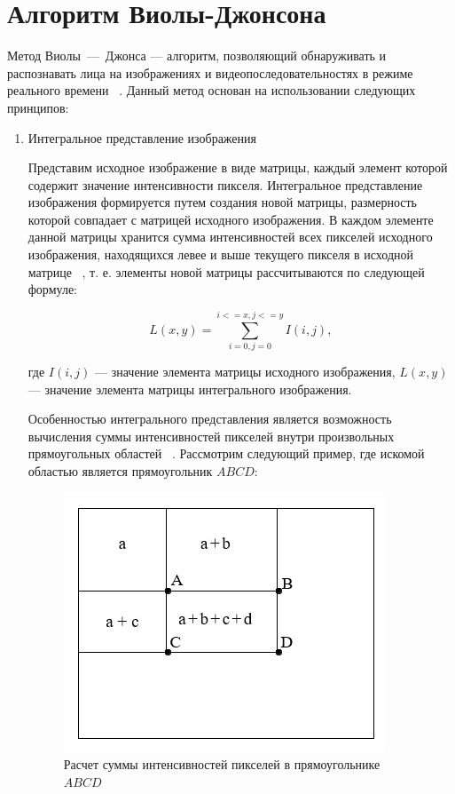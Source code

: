 \chapter{Алгоритм Виолы-Джонсона}

Метод Виолы~---~Джонса --- алгоритм, позволяющий обнаруживать и распознавать лица на изображениях и видеопоследовательностях в режиме реального времени ~\cite{viola}. Данный метод основан на использовании следующих принципов:
\begin{enumerate}
    \item Интегральное представление изображения

    Представим исходное изображение в виде матрицы, каждый элемент которой содержит значение интенсивности пикселя. Интегральное представление изображения формируется путем создания новой матрицы, размерность которой совпадает с матрицей исходного изображения. В каждом элементе данной матрицы хранится сумма интенсивностей всех пикселей исходного изображения, находящихся левее и выше текущего пикселя в исходной матрице ~\cite{tomsk}, т. е. элементы новой матрицы рассчитываются по следующей формуле:
    
    \begin{equation}
        L(x,y) = \sum_{i=0, j=0}^{i<=x, j<=y} I(i,j),
    \end{equation}

    где $I(i, j)$ --- значение элемента матрицы исходного изображения, $L(x,y)$ --- значение элемента матрицы интегрального изображения.

    Особенностью интегрального представления является возможность вычисления суммы интенсивностей пикселей внутри произвольных прямоугольных областей ~\cite{tomsk}. Рассмотрим следующий пример, где искомой областью является прямоугольник $ABCD$:

    \begin{figure}[h]
	\centering
	\includegraphics[height=0.25\textheight]{img/integral.jpg}
	\caption{Расчет суммы интенсивностей пикселей в прямоугольнике $ABCD$}
    \label{img:integral}
    \end{figure}


\end{enumerate}
